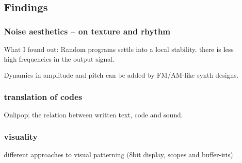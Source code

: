\documentclass[letterpaper, 12pt]{article}
\begin{document}
\subsection{Findings} %
\label{sub:findings}

\subsubsection*{Noise aesthetics -- on texture and rhythm} %
\label{sub:noise_aesthetics}


What I found out: Random programs settle into a local stability. there is less high frequencies in the output signal. 

Dynamics in amplitude and pitch can be added by FM/AM-like synth designs.



\subsubsection{translation of codes} %
\label{sub:translation_of_codes}

Oulipop; the relation between written text, code and sound.


\subsubsection{visuality} %
\label{sub:visuality}

different approaches to visual patterning (8bit display, scopes and buffer-iris)
\end{document}
